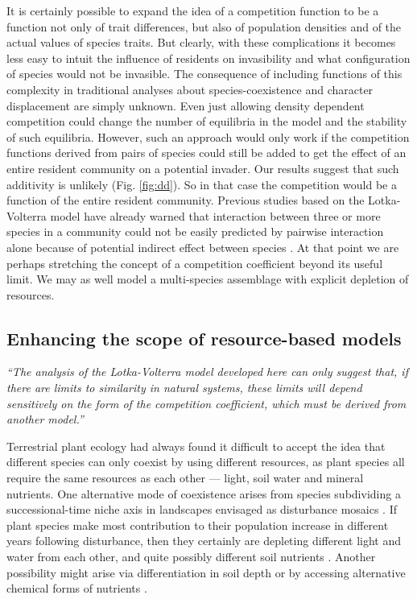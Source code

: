 \documentclass[a4paper,11pt]{article}
\begin{document}
It is certainly possible to expand the idea of a competition function to
be a function not only of trait differences, but also of population
densities and of the actual values of species traits. But clearly, with these complications it becomes less easy to intuit the influence of residents on invasibility and what configuration of species would not be invasible. The consequence of including functions of
this complexity in traditional analyses about species-coexistence and
character displacement are simply unknown.  Even just allowing density
dependent competition could change the number of equilibria in the
model and the stability of such equilibria.
%
However, such an approach would only work if the competition functions
derived from pairs of species could still be added to get the effect
of an entire resident community on a potential invader.
%
Our results suggest that such additivity is unlikely
(Fig. \ref{fig:dd}). %
 So in that case the competition would be a
function of the entire resident community. Previous studies based on the Lotka-Volterra model have already warned that interaction between three or more species in a community could not be easily predicted by pairwise interaction alone because of potential indirect effect between species \citep{Levine-1976}.
 At that point we are
perhaps stretching the concept of a competition coefficient
beyond its useful limit. We may as well
model a multi-species assemblage with explicit depletion of resources.

\subsection{Enhancing the scope of resource-based models}

\emph{``The analysis of the Lotka-Volterra model developed here can only
suggest that, if there are limits to similarity in natural systems, these
limits will depend sensitively on the form of the competition coefficient,
which must be derived from another model.''}\citep{Abrams-1975}

Terrestrial plant ecology had always found it difficult to accept the
idea that different species can only coexist by using different
resources, as plant species all require the same resources as each other ---
light, soil water and mineral nutrients. One alternative mode of coexistence
arises from species subdividing a successional-time niche axis in
landscapes envisaged as disturbance mosaics \citep{Connell-1978}. If
plant species make most contribution to their population increase in
different years following disturbance, then they certainly are
depleting different light and water from each other, and quite
possibly different soil nutrients \citep{Moorcroft-2001}. Another
possibility might arise via differentiation in soil depth or by accessing
alternative chemical forms of nutrients \citep{Tilman-1977}.
\end{document}
